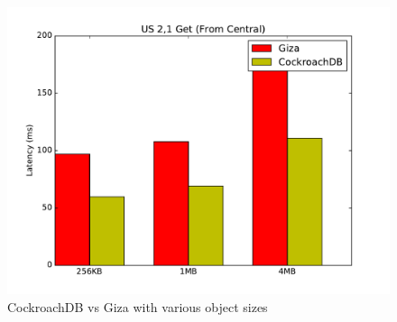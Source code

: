 \begin{figure}[t]
      \includegraphics[width=\linewidth]{images/cockroach_vs_giza_get}
      \caption{CockroachDB vs Giza with various object sizes}
      \label{fig:eval_cock_get}
\end{figure}
